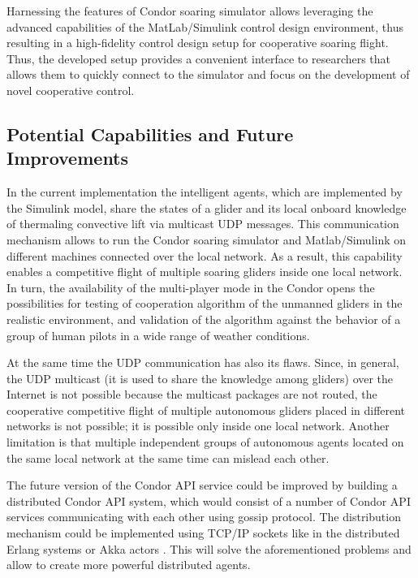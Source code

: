 \documentclass[letterpaper, 10 pt, conference]{ieeeconf}  %
\newcommand{\squeezeup}{\vspace{-1.0mm}}
\begin{document}
Harnessing the features of Condor soaring simulator allows leveraging the advanced capabilities of the MatLab/Simulink control design environment, thus resulting in a high-fidelity control design setup for cooperative soaring flight. Thus, the developed setup provides a convenient interface to researchers that allows them to quickly connect to the simulator and focus on the development of novel cooperative control.

\subsection{Potential Capabilities and Future Improvements}
\squeezeup
In the current implementation the intelligent agents, which are implemented by the Simulink model, share the states of a glider and its local onboard knowledge of thermaling convective lift via multicast UDP messages. This communication mechanism allows to run the Condor soaring simulator and Matlab/Simulink on different machines connected over the local network. As a result, this capability enables a competitive flight of multiple soaring gliders inside one local network. In turn, the availability of the multi-player mode in the Condor opens the possibilities for testing of cooperation algorithm of the unmanned gliders in the realistic environment, and validation of the algorithm against the behavior of a group of human pilots in a wide range of weather conditions.

At the same time the UDP communication has also its flaws. Since, in general, the UDP multicast (it is used to share the knowledge among gliders) over the Internet is not possible because the multicast packages are not routed, the cooperative competitive flight of multiple autonomous gliders placed in different networks is not possible; it is possible only inside one local network. Another limitation
is that multiple independent groups of autonomous agents located on the same local network at the same time can mislead each other.

The future version of the Condor API service could be improved by building a distributed Condor API system, which would consist of a number of Condor API services communicating with each other using gossip protocol\cite{Gupta:2006}. The distribution mechanism could be implemented using TCP/IP sockets like in the distributed Erlang systems \cite{Erlang:2013:Online} or Akka actors \cite{Akka:2013:Online}. This will solve the aforementioned problems and allow to create more powerful distributed agents.
\end{document}

